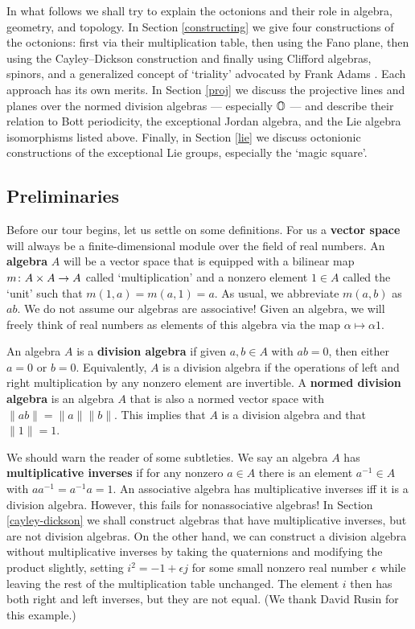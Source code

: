 In what follows we shall try to explain the octonions and their role in 
algebra, geometry, and topology.  In Section \ref{constructing} we give 
four constructions of the octonions: first via their multiplication   
table, then using the Fano plane, then using the Cayley--Dickson   
construction and finally using Clifford algebras, spinors, and a  
generalized concept of `triality' advocated by Frank Adams \cite{Adams}.
Each approach has its own merits.  In Section \ref{proj} we discuss
the projective lines and planes over the normed division algebras --- 
especially ${\mathbb O}$ --- and describe their relation to Bott periodicity,  
the exceptional Jordan algebra, and the Lie algebra isomorphisms listed 
above.  Finally, in Section \ref{lie} we discuss octonionic  
constructions of the exceptional Lie groups, especially the `magic 
square'.   
   
\subsection{Preliminaries} \label{preliminaries}

Before our tour begins, let us settle on some definitions.  For us a
{\bf vector space} will always be a finite-dimensional module over the
field of real numbers.  An {\bf algebra} $A$ will be a vector space that
is equipped with a bilinear map $m \colon A \times A \to A$ called
`multiplication' and a nonzero element $1 \in A$ called the `unit' such
that $m(1,a) = m(a,1) = a$.  As usual, we abbreviate $m(a,b)$ as $ab$.
We do not assume our algebras are associative!  Given an algebra, we
will freely think of real numbers as elements of this algebra via the
map $\alpha \mapsto \alpha 1$.
   
An algebra $A$ is a {\bf division algebra} if given $a,b \in A$ with $ab
= 0$, then either $a = 0$ or $b = 0$.  Equivalently, $A$ is a division
algebra if the operations of left and right multiplication by any
nonzero element are invertible.  A {\bf normed division algebra} is an
algebra $A$ that is also a normed vector space with $\|ab\| = \|a\|
\|b\|$.  This implies that $A$ is a division algebra and that $\|1\| =
1$.

We should warn the reader of some subtleties.  We say an algebra $A$ has
{\bf multiplicative inverses} if for any nonzero $a \in A$ there is an
element $a^{-1} \in A$ with $aa^{-1} = a^{-1}a = 1$.  An associative
algebra has multiplicative inverses iff it is a division
algebra.  However, this fails for nonassociative algebras!  In Section
\ref{cayley-dickson} we shall construct algebras that have
multiplicative inverses, but are not division algebras.  On the other
hand, we can construct a division algebra without multiplicative
inverses by taking the quaternions and modifying the product slightly,
setting $i^2 = -1 + \epsilon j$ for some small nonzero real number
$\epsilon$ while leaving the rest of the multiplication table unchanged.
The element $i$ then has both right and left inverses, but they are not
equal.  (We thank David Rusin for this example.)
   
